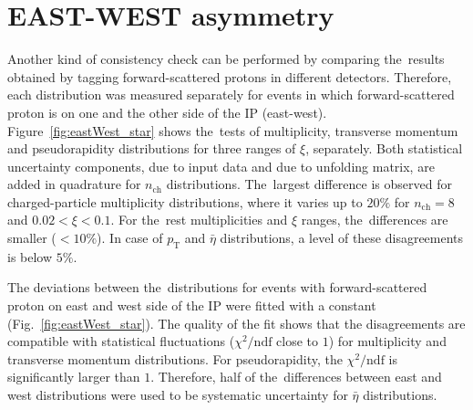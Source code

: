 \section{EAST-WEST asymmetry}\label{section:star_eastWest}
Another kind of consistency check can be performed by comparing the~results obtained by tagging forward-scattered protons in different detectors.
Therefore, each distribution was measured separately for events in which forward-scattered proton
is on one and the other side of the IP (east-west). 
Figure~\ref{fig:eastWest_star} shows the~tests of multiplicity, transverse momentum and pseudorapidity distributions for three ranges of $\xi$, separately. Both statistical uncertainty components, due to input data and due to unfolding matrix, are added in quadrature for $n_\textrm{ch}$ distributions.
The~largest difference is observed for charged-particle multiplicity distributions, where it varies up to $20\%$ for $n_\textrm{ch}=8$ and $0.02 < \xi < 0.1$. 
For the~rest multiplicities and $\xi$ ranges, the~differences are smaller ($<10\%$). In case of $p_\textrm{T}$ and $\bar{\eta}$ distributions, a level of  these disagreements is  below $5\%$. 


The deviations between the~distributions for events with forward-scattered proton on east and west side of the IP were fitted with a constant (Fig.~\ref{fig:eastWest_star}). The quality of the fit shows that the disagreements are compatible with statistical fluctuations ($\chi^{2}/\textrm{ndf}$ close to $1$)  for  multiplicity and transverse momentum distributions. For pseudorapidity, the $\chi^{2}/\textrm{ndf}$ is significantly  larger than $1$. Therefore, half of the~differences between east and west distributions were used to be  systematic uncertainty for $\bar{\eta}$ distributions.

